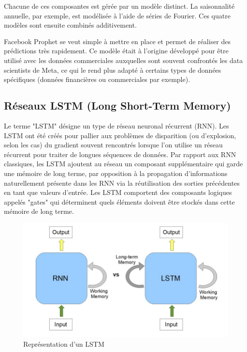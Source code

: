 \documentclass[french]{article}
\begin{document}
    Chacune de ces composantes est gérée par un modèle distinct. La saisonnalité annuelle, par exemple, est modélisée à l'aide de séries de Fourier. Ces quatre modèles sont ensuite combinés additivement.
    
    Facebook Prophet se veut simple à mettre en place et permet de réaliser des prédictions très rapidement. Ce modèle était à l'origine développé pour être utilisé avec les données commerciales auxquelles sont souvent confrontés les data scientists de Meta, ce qui le rend plus adapté à certains types de données spécifiques (données financières ou commerciales par exemple). 
    
    \subsection{Réseaux LSTM (Long Short-Term Memory)}

    Le terme "LSTM" désigne un type de réseau neuronal récurrent (RNN). Les LSTM ont été créés pour pallier aux problèmes de disparition (ou d'explosion, selon les cas) du gradient souvent rencontrés lorsque l'on utilise un réseau récurrent pour traiter de longues séquences de données.
    Par rapport aux RNN classiques, les LSTM ajoutent au réseau un composant supplémentaire qui garde une mémoire de long terme, par opposition à la propagation d'informations naturellement présente dans les RNN via la réutilisation des sorties précédentes en tant que valeurs d'entrée. Les LSTM comportent des composants logiques appelés "gates" qui déterminent quels éléments doivent être stockés dans cette mémoire de long terme.

    
    \begin{figure}[h]
        \includegraphics[width=12cm]{RNNvsLSTM}
        \centering
        \caption{Représentation d'un LSTM}
        \centering
    \end{figure}
\end{document}
